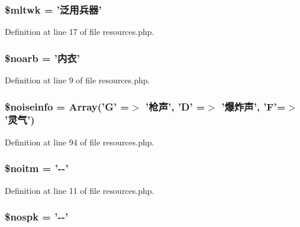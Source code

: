 \hypertarget{resources_8php_af12f55cfe5805f1081499f04e700478a}{
\subsubsection[{\$mltwk}]{\setlength{\rightskip}{0pt plus 5cm}\$mltwk = '泛用兵器'}}\label{resources_8php_af12f55cfe5805f1081499f04e700478a}


Definition at line 17 of file resources.\+php.

\hypertarget{resources_8php_a7042f4c981c7c1dd023648a96ee9a456}{
\subsubsection[{\$noarb}]{\setlength{\rightskip}{0pt plus 5cm}\$noarb = '内衣'}}\label{resources_8php_a7042f4c981c7c1dd023648a96ee9a456}


Definition at line 9 of file resources.\+php.

\hypertarget{resources_8php_a332324f513227af3ea62265b79326383}{
\subsubsection[{\$noiseinfo}]{\setlength{\rightskip}{0pt plus 5cm}\$noiseinfo = Array('G' =$>$ '枪声', 'D' =$>$ '爆炸声', 'F'=$>$'灵气')}}\label{resources_8php_a332324f513227af3ea62265b79326383}


Definition at line 94 of file resources.\+php.

\hypertarget{resources_8php_ad51c71e4cc6cd78c709454b5f2a2f84c}{
\subsubsection[{\$noitm}]{\setlength{\rightskip}{0pt plus 5cm}\$noitm = '-\/-\/'}}\label{resources_8php_ad51c71e4cc6cd78c709454b5f2a2f84c}


Definition at line 11 of file resources.\+php.

\hypertarget{resources_8php_a472cdfe07d9d5ca35696f2aa6848fd0c}{
\subsubsection[{\$nospk}]{\setlength{\rightskip}{0pt plus 5cm}\$nospk = '-\/-\/'}}\label{resources_8php_a472cdfe07d9d5ca35696f2aa6848fd0c}



